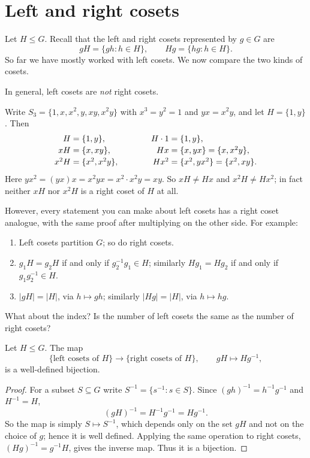 \documentclass[reqno,11pt]{amsart}
\begin{document}
\makelecturetitle

\section{Left and right cosets}

Let $H\leq G$. Recall that the left and right cosets represented by
$g\in G$ are
\[
  gH=\{gh:h\in H\},\qquad Hg=\{hg:h\in H\}.
\]
So far we have mostly worked with left cosets. We now compare the two
kinds of cosets.

In general, left cosets are \emph{not} right cosets.

\begin{example}
Write $S_3=\{1,x,x^2,y,xy,x^2y\}$ with
$x^3=y^2=1$ and $yx=x^2y$, and let $H=\{1,y\}$.
Then
\[
\begin{array}{r@{\;=\;}l@{\qquad\qquad}r@{\;=\;}l}
  H & \{1,y\}, & H\cdot1 & \{1,y\},\\[2pt]
  xH & \{x,xy\}, & Hx & \{x,yx\}=\{x,x^2y\},\\[2pt]
  x^2H & \{x^2,x^2y\}, & Hx^2 & \{x^2,yx^2\}=\{x^2,xy\}.
\end{array}
\]
Here $yx^2=(yx)x=x^2yx=x^2\cdot x^2y=xy$. So $xH\neq Hx$ and
$x^2H\neq Hx^2$; in fact neither $xH$ nor $x^2H$ is a right coset of $H$
at all.
\end{example}

However, every statement you can make about left cosets has a right coset
analogue, with the same proof after multiplying on the other side. For
example:
\begin{enumerate}[label=\textbf{(\arabic*)}]
  \item Left cosets partition $G$; so do right cosets.
  \item $g_1H=g_2H$ if and only if $g_2^{-1}g_1\in H$; similarly
  $Hg_1=Hg_2$ if and only if $g_1g_2^{-1}\in H$.
  \item $|gH|=|H|$, via $h\mapsto gh$; similarly $|Hg|=|H|$, via
  $h\mapsto hg$.
\end{enumerate}

What about the index? Is the number of left cosets the same as the number
of right cosets?

\begin{proposition}\label{prop:left-right-bijection}
Let $H\leq G$. The map
\[
  \{\text{left cosets of }H\}\longrightarrow\{\text{right cosets of }H\},
  \qquad gH\longmapsto Hg^{-1},
\]
is a well-defined bijection.
\end{proposition}
\begin{proof}
For a subset $S\subseteq G$ write $S^{-1}=\{s^{-1}:s\in S\}$. Since
$(gh)^{-1}=h^{-1}g^{-1}$ and $H^{-1}=H$,
\[
  (gH)^{-1}=H^{-1}g^{-1}=Hg^{-1}.
\]
So the map is simply $S\mapsto S^{-1}$, which depends only on the set
$gH$ and not on the choice of $g$; hence it is well defined. Applying the
same operation to right cosets, $(Hg)^{-1}=g^{-1}H$, gives the inverse
map. Thus it is a bijection.
\end{proof}
\end{document}
